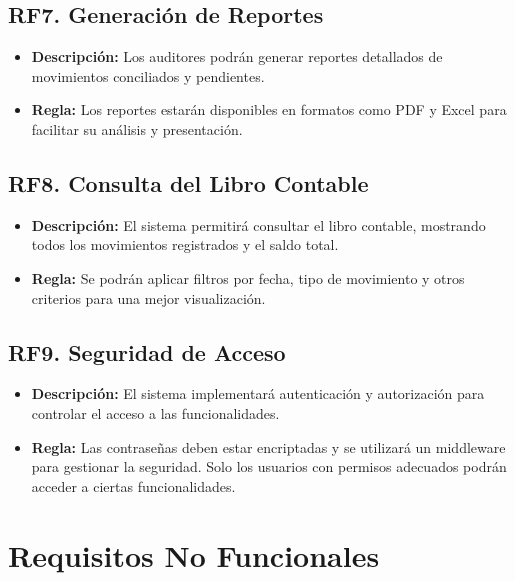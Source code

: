 \documentclass{article}
\begin{document}
\subsection{RF7. Generación de Reportes}
\begin{itemize}
    \item \textbf{Descripción:} Los auditores podrán generar reportes detallados de movimientos conciliados y pendientes.
    \item \textbf{Regla:} Los reportes estarán disponibles en formatos como PDF y Excel para facilitar su análisis y presentación.
\end{itemize}

\subsection{RF8. Consulta del Libro Contable}
\begin{itemize}
    \item \textbf{Descripción:} El sistema permitirá consultar el libro contable, mostrando todos los movimientos registrados y el saldo total.
    \item \textbf{Regla:} Se podrán aplicar filtros por fecha, tipo de movimiento y otros criterios para una mejor visualización.
\end{itemize}

\subsection{RF9. Seguridad de Acceso}
\begin{itemize}
    \item \textbf{Descripción:} El sistema implementará autenticación y autorización para controlar el acceso a las funcionalidades.
    \item \textbf{Regla:} Las contraseñas deben estar encriptadas y se utilizará un middleware para gestionar la seguridad. Solo los usuarios con permisos adecuados podrán acceder a ciertas funcionalidades.
\end{itemize}

\newpage
\section{Requisitos No Funcionales}
\end{document}
